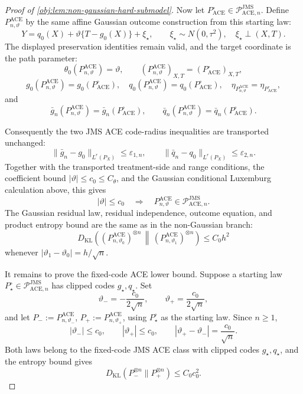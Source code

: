 \begin{proof}[Proof of \cref{obj:lem:non-gaussian-hard-submodel}]
Now let \(P_{\mathrm{ACE}}^\circ\in\mathcal P_{\mathrm{ACE},n}^{\mathrm{JMS}}\).  Define \(P_{n,\vartheta}^{\mathrm{ACE}}\) by the same affine Gaussian outcome construction from this starting law:
\[
Y=q_0(X)+\vartheta\{T-g_0(X)\}+\xi_\star,
\qquad
\xi_\star\sim N(0,\tau^2),\quad \xi_\star\perp(X,T).
\]
The displayed preservation identities remain valid, and the target coordinate is the path parameter:
\[
\theta_0(P_{n,\vartheta}^{\mathrm{ACE}})=\vartheta,
\qquad
(P_{n,\vartheta}^{\mathrm{ACE}})_{X,T}=(P_{\mathrm{ACE}}^\circ)_{X,T},
\]
\[
g_0(P_{n,\vartheta}^{\mathrm{ACE}})=g_0(P_{\mathrm{ACE}}^\circ),\quad
q_0(P_{n,\vartheta}^{\mathrm{ACE}})=q_0(P_{\mathrm{ACE}}^\circ),\quad
\eta_{P_{n,\vartheta}^{\mathrm{ACE}}}=\eta_{P_{\mathrm{ACE}}^\circ},
\]
and
\[
\bar g_n(P_{n,\vartheta}^{\mathrm{ACE}})=\bar g_n(P_{\mathrm{ACE}}^\circ),
\qquad
\bar q_n(P_{n,\vartheta}^{\mathrm{ACE}})=\bar q_n(P_{\mathrm{ACE}}^\circ).
\]

Consequently the two JMS ACE code-radius inequalities are transported unchanged:
\[
\|\bar g_n-g_0\|_{L^r(P_X)}\le\varepsilon_{1,n},
\qquad
\|\bar q_n-q_0\|_{L^r(P_X)}\le\varepsilon_{2,n}.
\]
Together with the transported treatment-side and range conditions, the coefficient bound \(|\vartheta|\le c_0\le C_{\theta}\), and the Gaussian conditional Luxemburg calculation above, this gives
\[
|\vartheta|\le c_0
\quad\Longrightarrow\quad
P_{n,\vartheta}^{\mathrm{ACE}}\in
\mathcal P_{\mathrm{ACE},n}^{\mathrm{JMS}} .
\]
The Gaussian residual law, residual independence, outcome equation, and product entropy bound are the same as in the non-Gaussian branch:
\[
D_{\mathrm{KL}}\!\left((P_{n,\vartheta_0}^{\mathrm{ACE}})^{\otimes n}\,\middle\|\,(P_{n,\vartheta_1}^{\mathrm{ACE}})^{\otimes n}\right)
\le C_0h^2
\]
whenever \(|\vartheta_1-\vartheta_0|=h/\sqrt n\). %

It remains to prove the fixed-code ACE lower bound.  Suppose a starting law \(P_\star^\circ\in\mathcal P_{\mathrm{ACE},n}^{\mathrm{JMS}}\) has clipped codes \(g_\star,q_\star\).  Set
\[
\vartheta_-=-\frac{c_0}{2\sqrt n},
\qquad
\vartheta_+=\frac{c_0}{2\sqrt n},
\]
and let \(P_-:=P_{n,\vartheta_-}^{\mathrm{ACE}}\), \(P_+:=P_{n,\vartheta_+}^{\mathrm{ACE}}\), using \(P_\star^\circ\) as the starting law.  Since \(n\ge1\),
\[
|\vartheta_-|\le c_0,
\qquad |\vartheta_+|\le c_0,
\qquad
|\vartheta_+-\vartheta_-|=\frac{c_0}{\sqrt n}.
\]
Both laws belong to the fixed-code JMS ACE class with clipped codes \(g_\star,q_\star\), and the entropy bound gives
\[
D_{\mathrm{KL}}(P_-^{\otimes n}\|P_+^{\otimes n})
\le C_0c_0^2.
\]


\end{proof}
